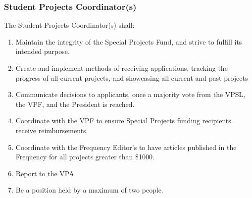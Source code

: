 
\subsubsection{Student Projects Coordinator(s)}
\label{special-projects-coordinators}

The Student Projects Coordinator(s) shall:
\begin{enumerate}
 \item
  Maintain the integrity of the Special Projects Fund, and strive to fulfill its intended purpose.
 \item
  Create and implement methods of receiving applications, tracking the progress of all current projects, and showcasing all current and past projects
 \item
  Communicate decisions to applicants, once a majority vote from the VPSL, the VPF, and the President is reached.
 \item
  Coordinate with the VPF to ensure Special Projects funding recipients receive reimbursements.
 \item
  Coordinate with the Frequency Editor's to have articles published in the Frequency for all projects greater than \$1000.
 \item
  Report to the VPA
 \item
  Be a position held by a maximum of two people.

\end{enumerate}
